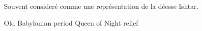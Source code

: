 \documentclass[a4paper,10pt,french]{sphinxhowto}
\begin{document}
\begin{figure}[htbp]
\centering
\capstart

\caption{Old Babylonian period Queen of Night relief}{\small 
Souvent consideré comme une représentation de la déesse Ishtar.
}\end{figure}



\renewcommand{\indexname}{Index}
\printindex
\end{document}
